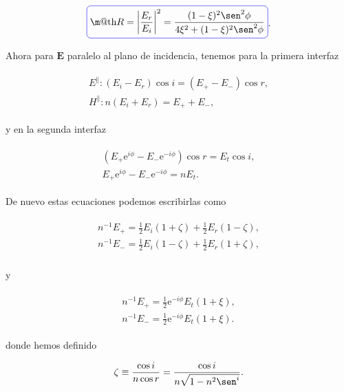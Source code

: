 \documentclass[a4paper,11pt]{article}
\makeatletter
\numberwithin{equation}{section}
\newcommand*{\boxcolor}{blue}
\renewcommand{\boxed}[1]{\textcolor{\boxcolor}{%
\tikz[baseline={([yshift=-1ex]current bounding box.center)}] \node [rectangle, minimum width=1ex,rounded corners,draw] {\normalcolor\m@th$\displaystyle#1$};}}
\newcommand{\euler}{\mathrm{e}}
\makeatother
\begin{document}
\begin{equation}
 \boxed{R = \left|\frac{E_r}{E_i} \right|^2 = \frac{(1 - \xi)^2\sen^2{\phi}}{4\xi^2 + 
 (1 - \xi)^2\sen^2{\phi}}}.
\end{equation}

Ahora para $\mathbf{E}$ paralelo al plano de incidencia, tenemos para la primera 
interfaz 

\begin{align}
 \begin{split}
  E^{\parallel} : (E_i - E_r)\cos{i} = (E_+ - E_-)\cos{r}, \\
  H^{\parallel} : n(E_i + E_r) = E_+ + E_-,
 \end{split}
\end{align}

y en la segunda interfaz 

\begin{align}
 \begin{split}
  (E_+ \euler^{i\phi} - E_-\euler^{-i\phi})\cos{r} = E_t \cos{i}, \\
  E_+ \euler^{i\phi} - E_-\euler^{-i\phi} = n E_t.
 \end{split}
\end{align}

De nuevo estas ecuaciones podemos escribirlas como 

\begin{align}
 \begin{split}
  n^{-1} E_+ = \frac{1}{2}E_i(1 + \zeta) + \frac{1}{2}E_r(1 - \zeta), \\
  n^{-1} E_- = \frac{1}{2}E_i(1 - \zeta) + \frac{1}{2}E_r(1 + \zeta), \\
 \end{split}
\end{align}

y 

\begin{align}
 \begin{split}
  n^{-1} E_+ = \frac{1}{2}\euler^{-i\phi}E_t(1 + \xi), \\
  n^{-1} E_- = \frac{1}{2}\euler^{-i\phi}E_t(1 + \xi).
 \end{split}
\end{align}

donde hemos definido 

\begin{equation}
 \zeta \equiv \frac{\cos{i}}{n\cos{r}} = \frac{\cos{i}}{n\sqrt{1 - n^2 \sen^{i}}}.
\end{equation}
\end{document}
